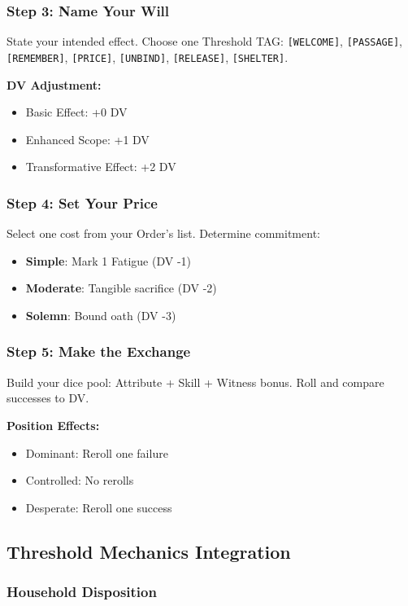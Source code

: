 \documentclass[11pt]{book}
\begin{document}
\subsubsection*{Step 3: Name Your Will}
State your intended effect.  
Choose one Threshold TAG: \texttt{[WELCOME]}, \texttt{[PASSAGE]}, \texttt{[REMEMBER]}, \texttt{[PRICE]}, \texttt{[UNBIND]}, \texttt{[RELEASE]}, \texttt{[SHELTER]}.  

\textbf{DV Adjustment:}
\begin{itemize}[noitemsep]
    \item Basic Effect: +0 DV
    \item Enhanced Scope: +1 DV
    \item Transformative Effect: +2 DV
\end{itemize}

\subsubsection*{Step 4: Set Your Price}
Select one cost from your Order's list.  
Determine commitment:

\begin{itemize}[noitemsep]
    \item \textbf{Simple}: Mark 1 Fatigue (DV -1)
    \item \textbf{Moderate}: Tangible sacrifice (DV -2)
    \item \textbf{Solemn}: Bound oath (DV -3)
\end{itemize}

\subsubsection*{Step 5: Make the Exchange}
Build your dice pool: Attribute + Skill + Witness bonus.  
Roll and compare successes to DV.

\textbf{Position Effects:}
\begin{itemize}[noitemsep]
    \item Dominant: Reroll one failure
    \item Controlled: No rerolls
    \item Desperate: Reroll one success
\end{itemize}

\subsection*{Threshold Mechanics Integration}

\subsubsection*{Household Disposition}
\end{document}
